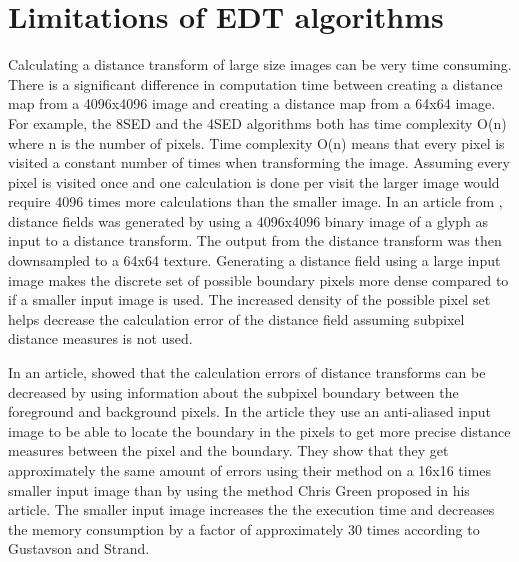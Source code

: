 \section{Limitations of EDT algorithms}\label{limitEDT}
Calculating a distance transform of large size images can be very time consuming. There is a significant difference in computation time between creating a distance map from a 4096x4096 image and creating a distance map from a 64x64 image. For example, the 8SED and the 4SED algorithms both has time complexity O(n) where n is the number of pixels. Time complexity O(n) means that every pixel is visited a constant number of times when transforming the image. Assuming every pixel is visited once and one calculation is done per visit the larger image would require 4096 times more calculations than the smaller image. In an article from \citet{Green:2007}, distance fields was generated by using a 4096x4096 binary image of a glyph as input to a distance transform. The output from the distance transform was then downsampled to a 64x64 texture. Generating a distance field using a large input image makes the discrete set of possible boundary pixels more dense compared to if a smaller input image is used. The increased density of the possible pixel set helps decrease the calculation error of the distance field assuming subpixel distance measures is not used.

In an article, \citet{Gustavson:2011} showed that the calculation errors of distance transforms can be decreased by using information about the subpixel boundary between the foreground and background pixels. In the article they use an anti-aliased input image to be able to locate the boundary in the pixels to get more precise distance measures between the pixel and the boundary. They show that they get approximately the same amount of errors using their method on a 16x16 times smaller input image than by using the method Chris Green proposed in his article. The smaller input image increases the the execution time and decreases the memory consumption by a factor of approximately 30 times according to Gustavson and Strand.

